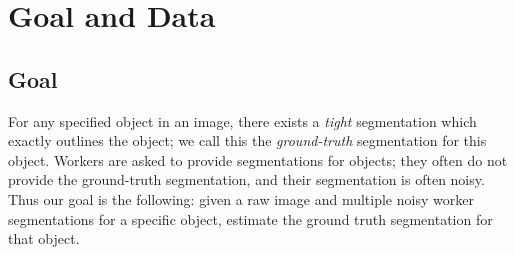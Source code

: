 \section{Goal and Data\label{sec:goal}}
\subsection{Goal}
For any specified object in an image, 
there exists a {\em tight} segmentation 
which exactly outlines the object; we call this
the {\em ground-truth} segmentation for this object. 
Workers are asked to provide segmentations for objects;
they often do not provide the ground-truth segmentation,
and their segmentation is often noisy.
Thus our goal is the following:
given a raw image and multiple noisy worker segmentations 
for a specific object, estimate the 
ground truth segmentation for that object.  
